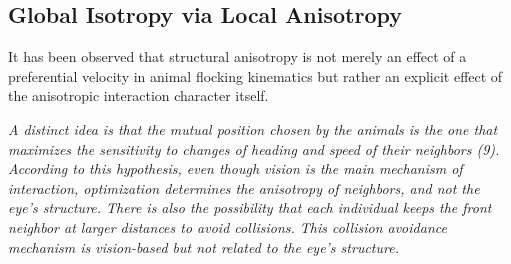 \subsection{Global Isotropy via Local Anisotropy}
%
It has been observed that structural anisotropy is not merely an effect of a preferential velocity in animal flocking kinematics but rather an explicit effect of the anisotropic interaction character itself.
 
\textit{ A distinct idea is that the mutual position chosen by the animals is the one that maximizes the sensitivity to changes of heading and speed of their neighbors (9). According to this hypothesis, even though vision is the main mechanism of interaction, optimization determines the anisotropy of neighbors, and not the eye's structure. There is also the possibility that each individual keeps the front neighbor at larger distances to avoid collisions. This collision avoidance mechanism is vision-based but not related to the eye's structure.
}%

